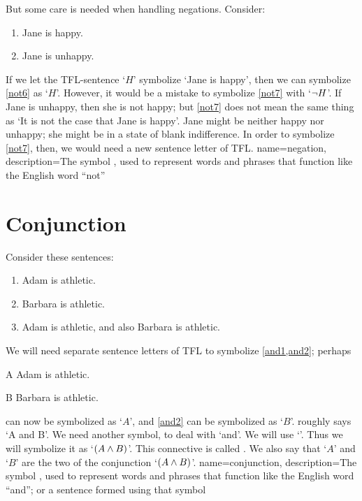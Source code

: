 But some care is needed when handling negations. Consider:
	\begin{enumerate}
		\item\label{not6} Jane is happy.
		\item\label{not7} Jane is unhappy.
	\end{enumerate}
If we let the TFL-sentence `$H$' symbolize  `Jane is happy', then we can symbolize \cref*{not6} as `$H$'. However, it would be a mistake to symbolize \cref*{not7} with `$\neg{H}$'. If Jane is unhappy, then she is not happy; but \cref*{not7} does not mean the same thing as `It is not the case that Jane is happy'. Jane might be neither happy nor unhappy; she might be in a state of blank indifference. In order to symbolize \cref*{not7}, then, we would need a new sentence letter of TFL.
{
name=negation,
description={The symbol \enot, used to represent words and phrases that function like the English word ``not''}
}

\section{Conjunction}
\label{s:ConnectiveConjunction}

Consider these sentences:
	\begin{enumerate}
		\item\label{and1}Adam is athletic.
		\item\label{and2}Barbara is athletic.
		\item\label{and3}Adam is athletic, and also Barbara is athletic.
	\end{enumerate}
We will need separate sentence letters of TFL to symbolize \cref*{and1,and2}; perhaps
	\begin{ekey}
		\item[A] Adam is athletic.
		\item[B] Barbara is athletic.
	\end{ekey}
 can now be symbolized as `$A$', and \cref*{and2} can be symbolized as `$B$'.  roughly says `A and B'. We need another symbol, to deal with `and'. We will use `\eand'. Thus we will symbolize it as `$(A\wedge B)$'. This connective is called . We also say that `$A$' and `$B$' are the two  of the conjunction `$(A \wedge B)$'.
{
name=conjunction,
description={The symbol \eand, used to represent words and phrases that function like the English word ``and''; or a sentence formed using that symbol}
}

